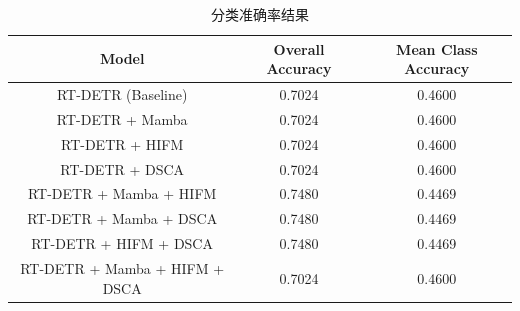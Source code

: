 \begin{table}[h]
\centering
\caption{分类准确率结果}
\label{tab:ablation}
\begin{tabular}{c|c|c}
\hline
Model & Overall Accuracy & Mean Class Accuracy \\
\hline
RT-DETR (Baseline) & 0.7024 & 0.4600 \\
\hline
RT-DETR + Mamba & 0.7024 & 0.4600 \\
\hline
RT-DETR + HIFM & 0.7024 & 0.4600 \\
\hline
RT-DETR + DSCA & 0.7024 & 0.4600 \\
\hline
RT-DETR + Mamba + HIFM & 0.7480 & 0.4469 \\
\hline
RT-DETR + Mamba + DSCA & 0.7480 & 0.4469 \\
\hline
RT-DETR + HIFM + DSCA & 0.7480 & 0.4469 \\
\hline
RT-DETR + Mamba + HIFM + DSCA & 0.7024 & 0.4600 \\
\hline
\end{tabular}
\end{table}
